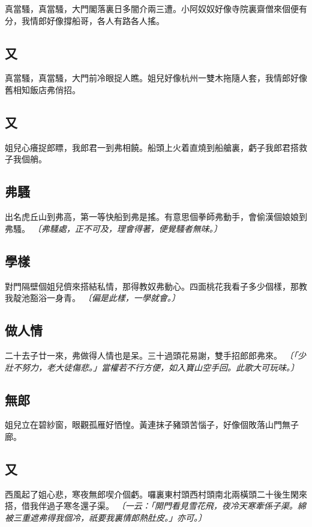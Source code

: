 真當騷，真當騷，大門閣落裏日多闇介兩三遭。小阿奴奴好像寺院裏齋僧來個便有分，我情郎好像撐船哥，各人有路各人搖。

\subsection*{又}

真當騷，真當騷，大門前冷眼捉人瞧。姐兒好像杭州一雙木拖隨人套，我情郎好像舊相知飯店弗俏招。

\subsection*{又}

姐兒心癢捉郎瞟，我郎君一到弗相饒。船頭上火着直燒到船艙裏，虧子我郎君搭救子我個艄。

\subsection*{弗騷}

出名虎丘山到弗高，第一等快船到弗是搖。有意思個拳師弗動手，會偷漢個娘娘到弗騷。
\textit{〔弗騷處，正不可及，理會得著，便覺騷者無味。〕}

\subsection*{學樣}

對門隔壁個姐兒儕來搭結私情，那得教奴弗動心。四面桃花我看子多少個樣，那教我靛池豁浴一身青。
\textit{〔偏是此樣，一學就會。〕}

\subsection*{做人情}

二十去子廿一來，弗做得人情也是呆。三十過頭花易謝，雙手招郎郎弗來。
\textit{〔「少壯不努力，老大徒傷悲。」當權若不行方便，如入寶山空手回。此歌大可玩味。〕}

\subsection*{無郎}

姐兒立在碧紗窗，眼觀孤雁好恓惶。黃連抹子豬頭苦惱子，好像個敗落山門無子廊。

\subsection*{又}

西風起了姐心悲，寒夜無郎喫介個虧。囉裏東村頭西村頭南北兩橫頭二十後生閑來搭，借我伴過子寒冬還子渠。
\textit{〔一云：「開門看見雪花飛，夜冷天寒牽係子渠。綿被三重遮弗得我個冷，祇要我裏情郎熱肚皮。」亦可。〕}

